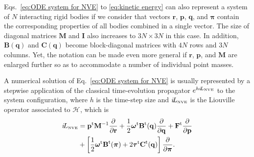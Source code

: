 \documentclass[
	aip,
	jcp,
	reprint,
]{revtex4-1}
\newcommand{\mt}[1]{\boldsymbol{\mathbf{#1}}}          %
\newcommand{\vt}[1]{\boldsymbol{\mathbf{#1}}}          %
\newcommand{\tr}[1]{#1^\text{t}}                       %
\newcommand{\diff}[2]{\frac{\partial #1}{\partial #2}} %
\newcommand{\Ham}[1]{{\mathcal H}_\text{#1}}           %
\newcommand{\Liu}[1]{i\!L_\text{#1}}                   %
\newcommand{\timestep}{h}
\begin{document}
Eqs.~\eqref{eq:ODE system for NVE} to \eqref{eq:kinetic energy} can also represent a system of $N$ interacting rigid bodies if we consider that vectors $\vt r$, $\vt p$, $\vt q$, and $\vt \pi$ contain the corresponding properties of all bodies combined in a single vector.
The size of diagonal matrices $\mt M$ and $\mt I$ also increases to $3N \times 3N$ in this case.
In addition, $\mt B(\vt q)$ and $\mt C(\vt q)$ become block-diagonal matrices with $4N$ rows and $3N$ columns.
Yet, the notation can be made even more general if $\vt r$, $\vt p$, and $\mt M$ are enlarged further so as to accommodate a number of individual point masses.

A numerical solution of Eq.~\eqref{eq:ODE system for NVE} is usually represented by a stepwise application of the classical time-evolution propagator \cite{Tuckerman_2010} $e^{\timestep \Liu{\tiny NVE}}$ to the system configuration, where $\timestep$ is the time-step size and $\Liu{\tiny NVE}$ is the Liouville operator associated to $\Ham{}$, which is
\begin{equation}
\label{eq:Lioville operator}
\begin{split}
\Liu{\tiny NVE} &= \tr{\vt p} {\mt M}^{-1} \diff{}{\vt r} + \frac{1}{2} \tr{\vt \omega} \tr{\mt B}(\vt q) \diff{}{\vt q} + \tr{\vt F} \diff{}{\vt p} \\
&+ \left[ \frac{1}{2} \tr{\vt \omega} \tr{\mt B}(\vt \pi) + 2 \tr{\vt \tau} \tr{\mt C}(\vt q) \right] \diff{}{\vt \pi}.
\end{split}
\end{equation}
\end{document}
